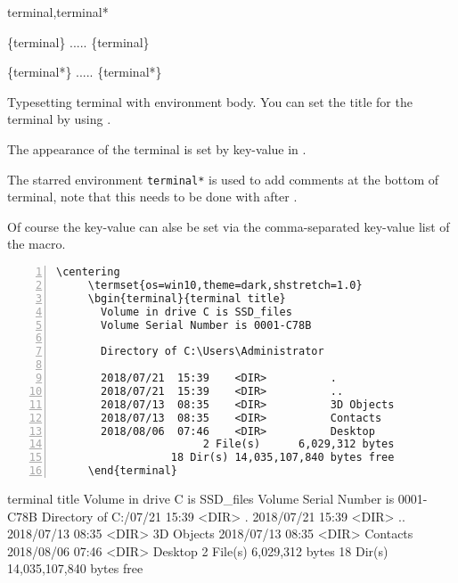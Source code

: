 \documentclass{ctxdoc}
\begin{document}
 \begin{function}[added=2021-12-17,updated=2021-12-17]{terminal,terminal*}
   \begin{syntax}
     \{terminal\}  
     .....
     \{terminal\}

     \{terminal*\}   
     .....
     \{terminal*\}
   \end{syntax}

   Typesetting terminal with environment body.
   You can set the title for the terminal by using .

   The appearance of the terminal is set by key-value in .

   The starred environment \texttt{terminal*} is used to add comments at the bottom of terminal,
   note that this needs to be done with  after .

   Of course the key-value  can alse be set 
   via the comma-separated key-value list of the  macro.

 \end{function}
   \begin{Verbatim}[frame=none,numbers=left,gobble=5]
     \centering
     \termset{os=win10,theme=dark,shstretch=1.0}
     \bgin{terminal}{terminal title}
       Volume in drive C is SSD_files
       Volume Serial Number is 0001-C78B

       Directory of C:\Users\Administrator

       2018/07/21  15:39    <DIR>          .
       2018/07/21  15:39    <DIR>          ..
       2018/07/13  08:35    <DIR>          3D Objects
       2018/07/13  08:35    <DIR>          Contacts
       2018/08/06  07:46    <DIR>          Desktop
                       2 File(s)      6,029,312 bytes
                  18 Dir(s) 14,035,107,840 bytes free
     \end{terminal}
   \end{Verbatim}

\begin{center}
\begin{minipage}{0.85\textwidth}
\begin{terminal}{terminal title}
    Volume in drive C is SSD_files
    Volume Serial Number is 0001-C78B
    Directory of C:\Users{}/07/21  15:39    <DIR>          .
  2018/07/21  15:39    <DIR>          ..
  2018/07/13  08:35    <DIR>          3D Objects
  2018/07/13  08:35    <DIR>          Contacts
  2018/08/06  07:46    <DIR>          Desktop
                  2 File(s)      6,029,312 bytes
             18 Dir(s) 14,035,107,840 bytes free
\end{terminal}
\end{minipage}
\end{center}
\end{document}
